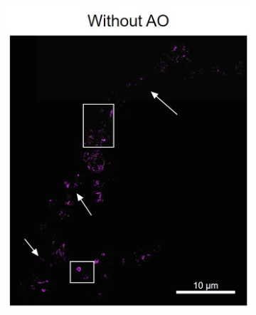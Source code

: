 \begin{figure}
	\centering
	\begin{subfigure}[t]{0.49\textwidth}
		\centering
		\includegraphics[width=\linewidth]{images/DeepSIM_NMJ_woAO.jpg}
		\caption{}
		\label{fig:DeepSIM_NMJ_woAO}
	\end{subfigure}
	\begin{subfigure}[t]{0.49\textwidth}
		\centering

\end{subfigure}
\end{figure}
